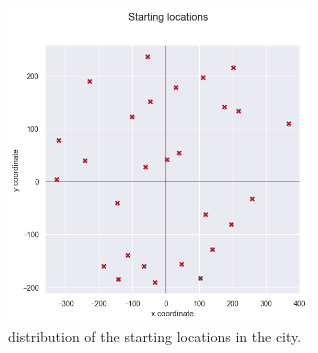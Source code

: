 \begin{figure}[h]
	\centering
	\includegraphics[width=80mm]{figures/starting_locations.png}
	\caption{distribution of the starting locations in the city.}
	\label{fig:starting_locs}
\end{figure}



